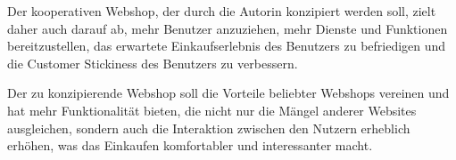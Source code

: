 Der kooperativen Webshop, der durch die Autorin konzipiert werden soll, zielt daher auch darauf ab, mehr Benutzer anzuziehen, mehr Dienste und Funktionen bereitzustellen, das erwartete Einkaufserlebnis des Benutzers zu befriedigen und die Customer Stickiness des Benutzers zu verbessern.

Der zu konzipierende Webshop soll die Vorteile beliebter Webshops vereinen und hat mehr Funktionalität bieten, die nicht nur die Mängel anderer Websites ausgleichen, sondern auch die Interaktion zwischen den Nutzern erheblich erhöhen, was das Einkaufen komfortabler und interessanter macht.










